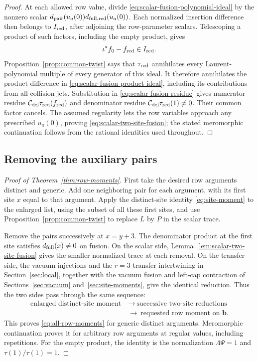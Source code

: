\begin{proof}
At each allowed row value, divide \eqref{eq:scalar-fusion-polynomial-ideal} by the nonzero scalar
\(d_{\rm pair}(u_a(0))d_{{\rm full},{\rm red}}(u_a(0))\). Each normalized insertion difference then belongs to \(I_{\rm red}\), after adjoining the row-parameter scalars. Telescoping a product of such factors, including the empty product, gives
\begin{equation}\label{eq:scalar-fusion-product-ideal}
 \iota^*f_0-f_{\rm red}\in I_{\rm red}.
\end{equation}
Proposition~\ref{prop:common-twist} says that \(\tau_{\rm red}\) annihilates every Laurent-polynomial multiple of every generator of this ideal. It therefore annihilates the product difference in \eqref{eq:scalar-fusion-product-ideal}, including its contributions from all collision jets. Substitution in \eqref{eq:scalar-fusion-residue} gives numerator residue \(\mathcal C_{\rm del}\tau_{\rm red}(f_{\rm red})\) and denominator residue \(\mathcal C_{\rm del}\tau_{\rm red}(1)\ne0\). Their common factor cancels. The assumed regularity lets the row variables approach any prescribed \(u_a(0)\), proving \eqref{eq:scalar-two-site-fusion}; the stated meromorphic continuation follows from the rational identities used throughout.
\end{proof}

\subsection{Removing the auxiliary pairs}

\begin{proof}[Proof of Theorem~\ref{thm:row-moments}]
First take the desired row arguments distinct and generic. Add one neighboring pair for each argument, with its first site $x$ equal to that argument. Apply the distinct-site identity \eqref{eq:site-moment} to the enlarged list, using the subset of all these first sites, and use Proposition~\ref{prop:common-twist} to replace $L$ by $P$ in the scalar trace.

Remove the pairs successively at $x=y+3$. The denominator product at the first site satisfies $d_{\rm full}(x)\ne0$ on fusion. On the scalar side, Lemma~\ref{lem:scalar-two-site-fusion} gives the smaller normalized trace at each removal. On the transfer side, the vacuum injections and the $r=3$ transfer intertwining in Section~\ref{sec:local}, together with the vacuum fusion and left-cap contraction of Sections~\ref{sec:vacuum} and~\ref{sec:site-moments}, give the identical reduction. Thus the two sides pass through the same sequence:
\[
 \begin{aligned}
 \text{enlarged distinct-site moment}
 &\ \longrightarrow\ \text{successive two-site reductions}\\
 &\ \longrightarrow\ \text{requested row moment on }\mathbf b.
 \end{aligned}
\]
This proves \eqref{eq:all-row-moments} for generic distinct arguments. Meromorphic continuation proves it for arbitrary row arguments at regular values, including repetitions. For the empty product, the identity is the normalization $\Lambda\Psi=1$ and $\tau(1)/\tau(1)=1$.
\end{proof}
